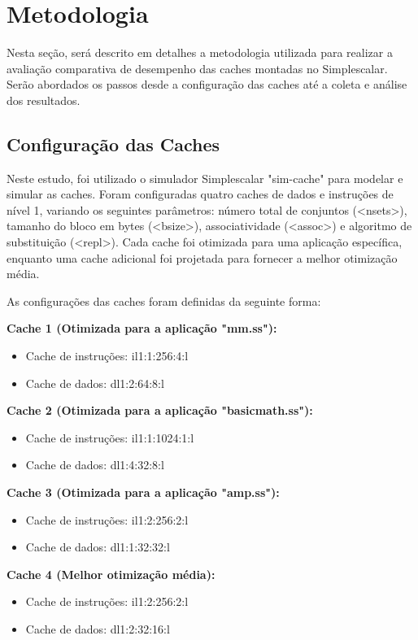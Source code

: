 \documentclass[12pt]{article}
\begin{document}
\section{Metodologia} \label{sec:metodologia}
Nesta seção, será descrito em detalhes a metodologia utilizada para realizar a avaliação comparativa de desempenho das caches montadas no Simplescalar. Serão abordados os passos desde a configuração das caches até a coleta e análise dos resultados.

\subsection{Configuração das Caches}
Neste estudo, foi utilizado o simulador Simplescalar "sim-cache" para modelar e simular as caches. Foram configuradas quatro caches de dados e instruções de nível 1, variando os seguintes parâmetros: número total de conjuntos (\textless nsets\textgreater), tamanho do bloco em bytes (\textless bsize\textgreater), associatividade (\textless assoc\textgreater) e algoritmo de substituição (\textless repl\textgreater). Cada cache foi otimizada para uma aplicação específica, enquanto uma cache adicional foi projetada para fornecer a melhor otimização média.

As configurações das caches foram definidas da seguinte forma:

\textbf{Cache 1 (Otimizada para a aplicação "mm.ss"):}
\begin{itemize}
\item Cache de instruções: il1:1:256:4:l
\item Cache de dados: dl1:2:64:8:l
\end{itemize}

\textbf{Cache 2 (Otimizada para a aplicação "basicmath.ss"):}
\begin{itemize}
\item Cache de instruções: il1:1:1024:1:l
\item Cache de dados: dl1:4:32:8:l
\end{itemize}

\textbf{Cache 3 (Otimizada para a aplicação "amp.ss"):}
\begin{itemize}
\item Cache de instruções: il1:2:256:2:l
\item Cache de dados: dl1:1:32:32:l
\end{itemize}

\textbf{Cache 4 (Melhor otimização média):}
\begin{itemize}
\item Cache de instruções: il1:2:256:2:l
\item Cache de dados: dl1:2:32:16:l
\end{itemize}
\end{document}

